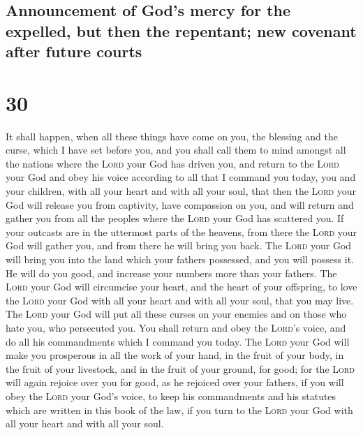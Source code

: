 \hypertarget{announcement-of-gods-mercy-for-the-expelled-but-then-the-repentant-new-covenant-after-future-courts}{%
\subsection{Announcement of God's mercy for the expelled, but then the
repentant; new covenant after future
courts}\label{announcement-of-gods-mercy-for-the-expelled-but-then-the-repentant-new-covenant-after-future-courts}}

\hypertarget{section-29}{%
\section{30}\label{section-29}}

 It shall happen, when all these things have come on you,
the blessing and the curse, which I have set before you, and you shall
call them to mind amongst all the nations where the \textsc{Lord} your
God has driven you,  and return to the \textsc{Lord} your
God and obey his voice according to all that I command you today, you
and your children, with all your heart and with all your soul,
 that then the \textsc{Lord} your God will release you
from captivity, have compassion on you, and will return and gather you
from all the peoples where the \textsc{Lord} your God has scattered you.
 If your outcasts are in the uttermost parts of the
heavens, from there the \textsc{Lord} your God will gather you, and from
there he will bring you back.  The \textsc{Lord} your God
will bring you into the land which your fathers possessed, and you will
possess it. He will do you good, and increase your numbers more than
your fathers.  The \textsc{Lord} your God will circumcise
your heart, and the heart of your offspring, to love the \textsc{Lord}
your God with all your heart and with all your soul, that you may live.
 The \textsc{Lord} your God will put all these curses on
your enemies and on those who hate you, who persecuted you.
 You shall return and obey the \textsc{Lord}'s voice, and
do all his commandments which I command you today.  The
\textsc{Lord} your God will make you prosperous in all the work of your
hand, in the fruit of your body, in the fruit of your livestock, and in
the fruit of your ground, for good; for the \textsc{Lord} will again
rejoice over you for good, as he rejoiced over your fathers,
 if you will obey the \textsc{Lord} your God's voice, to
keep his commandments and his statutes which are written in this book of
the law, if you turn to the \textsc{Lord} your God with all your heart
and with all your soul.

